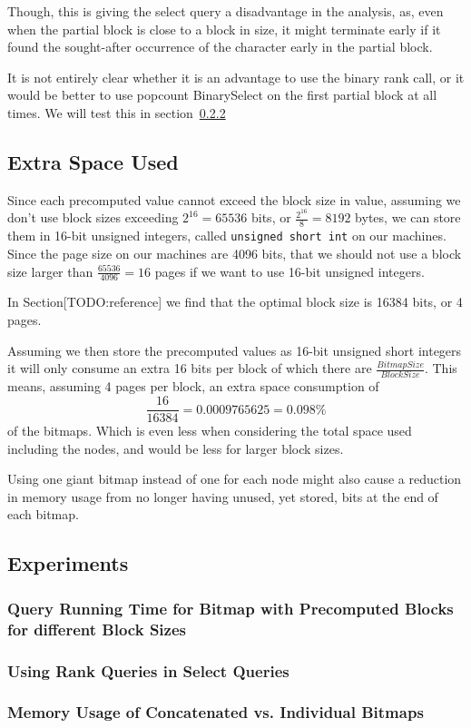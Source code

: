 Though, this is giving the select query a disadvantage in the analysis, as, even when the partial block is close to a block in size, it might terminate early if it found the sought-after occurrence of the character early in the partial block.

It is not entirely clear whether it is an advantage to use the binary rank call, or it would be better to use popcount BinarySelect on the first partial block at all times.
We will test this in section~\ref{sec:experimentPrecomputedBlocksRankInSelect}



\subsection{Extra Space Used}
Since each precomputed value cannot exceed the block size in value, assuming we don't use block sizes exceeding $2^{16} = 65536$ bits, or $\frac{2^{16}}{8} = 8192$ bytes, we can store them in 16-bit unsigned integers, called \texttt{unsigned short int} on our machines. Since the page size on our machines are 4096 bits, that we should not use a block size larger than $\frac{65536}{4096} = 16$ pages if we want to use 16-bit unsigned integers.

In Section[TODO:reference] we find that the optimal block size is 16384 bits, or 4 pages.

Assuming we then store the precomputed values as 16-bit unsigned short integers it will only consume an extra 16 bits per block of which there are $\frac{BitmapSize}{BlockSize}$.
This means, assuming 4 pages per block, an extra space consumption of
\[ \frac{16}{16384} = 0.0009765625 = 0.098\% \]
of the bitmaps.
Which is even less when considering the total space used including the nodes, and would be less for larger block sizes.

Using one giant bitmap instead of one for each node might also cause a reduction in memory usage from no longer having unused, yet stored, bits at the end of each bitmap.


\subsection{Experiments}
\subsubsection{Query Running Time for Bitmap with Precomputed Blocks for different Block Sizes}

\subsubsection{Using Rank Queries in Select Queries}
\label{sec:experimentPrecomputedBlocksRankInSelect}

\subsubsection{Memory Usage of Concatenated vs. Individual Bitmaps}